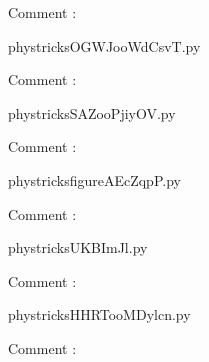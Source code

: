     Comment : 

    \clearpage
    


    \newcommand{\CaptionFigOGWJooWdCsvT}{<+Type your caption here+>}
    \begin{center}
        
    \end{center}
    phystricksOGWJooWdCsvT.py

    Comment : 

    \clearpage
    


    \newcommand{\CaptionFigSAZooPjiyOV}{<+Type your caption here+>}
    \begin{center}
        
    \end{center}
    phystricksSAZooPjiyOV.py

    Comment : 

    \clearpage
    


    \newcommand{\CaptionFigfigureAEcZqpP}{<+Type your caption here+>}
    \begin{center}
        
    \end{center}
    phystricksfigureAEcZqpP.py

    Comment : 

    \clearpage
    


    \newcommand{\CaptionFigUKBImJl}{<+Type your caption here+>}
    \begin{center}
        
    \end{center}
    phystricksUKBImJl.py

    Comment : 

    \clearpage
    


    \newcommand{\CaptionFigHHRTooMDylcn}{<+Type your caption here+>}
    \begin{center}
        
    \end{center}
    phystricksHHRTooMDylcn.py

    Comment : 

    \clearpage
    

